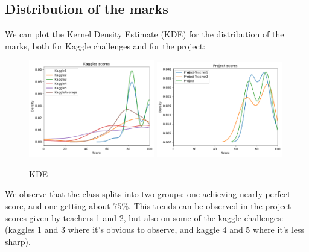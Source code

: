 \documentclass[a4paper]{article}
\begin{document}
	\subsection{Distribution of the marks}
	We can plot the Kernel Density Estimate (KDE) for the distribution of the marks, both for Kaggle challenges and for the project:
	\begin{figure}[H]
		\centering
		\includegraphics[width=0.49\textwidth]{figures/kaggles_densities.pdf}
		\includegraphics[width=0.49\textwidth]{figures/project_densities.pdf}
		\caption{KDE}
		\label{fig:KDE}
	\end{figure}
	We observe that the class splits into two groups: one achieving nearly perfect score, and one getting about $75\%$.
	This trends can be observed in the project scores given by teachers 1 and 2, but also on some of the kaggle challenges: (kaggles 1 and 3 where it's obvious to observe, and kaggle 4 and 5 where it's less sharp).
	
\end{document}

